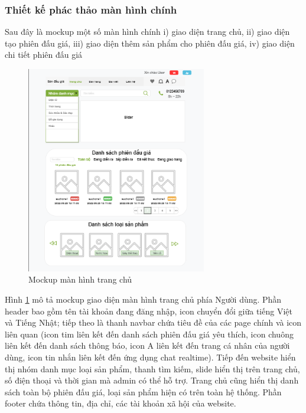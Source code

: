 \documentclass[../DoAn.tex]{subfiles}
\begin{document}
\subsubsection{Thiết kế phác thảo màn hình chính}
Sau đây là mockup một số màn hình chính i) giao diện trang chủ, ii) giao diện tạo phiên đấu giá, iii) giao diện thêm sản phẩm cho phiên đấu giá, iv) giao diện chi tiết phiên đấu giá
\begin{figure}[H]
    \centering
    \includegraphics[width=7.87cm,height=9.07cm]{Hinhve/homepage.png}
    \caption{Mockup màn hình trang chủ}
    \label{fig:Fig48}
\end{figure}
Hình \ref{fig:Fig48} mô tả mockup giao diện màn hình trang chủ phía Người dùng. Phần header bao gồm tên tài khoản đang đăng nhập, icon chuyển đổi giữa tiếng Việt và Tiếng Nhật; tiếp theo là thanh navbar chứa tiêu đề của các page chính và icon liên quan (icon tim liên kết đến danh sách phiên đấu giá yêu thích, icon chuông liên kết đến danh sách thông báo, icon A liên kết đến trang cá nhân của người dùng, icon tin nhắn liên kết đến ứng dụng chat realtime). Tiếp đến website hiển thị nhóm danh mục loại sản phẩm, thanh tìm kiếm, slide hiển thị trên trang chủ, số điện thoại và thời gian mà admin có thể hỗ trợ. Trang chủ cũng hiển thị danh sách toàn bộ phiên đấu giá, loại sản phẩm hiện có trên toàn hệ thống. Phần footer chứa thông tin, địa chỉ, các tài khoản xã hội của website.
\end{document}
